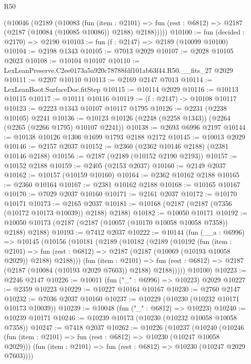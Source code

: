 \begin{lexlean}{R50}
\begin{coremodule}
      (@10046
        (@2189
          (@10083
            (fun (item : @2101) =>
            fun (rest : @6812) => @2187 (@2187 (@10084 (@10085 @10086)) @2188) @2188)))))
@10100 := fun (decided : @2170) => @2190
@10103 := fun (f : @2147) => @2189 (@10099 @10100)
@10104 := @2198 @1343
@10105 := @7013 @2029
@10107 := @2028 @10105 @2023
@10108 := @10104 @10107
@10110 := LexLeanPreserve.C2ee0173a5a920c78788fdf101ab63f44.R50.__fits_27 @2029
@10111 := @2207 @10110
@10113 := @2169 @2147 @7013
@10114 := LexLeanBoot.SurfaceDoc.fitStep
@10115 := @10114 @2029
@10116 := @10113 @10115
@10117 := @10111 @10116
@10119 := (f : @2147) -> @10108 @10117
@10123 := @2223 @1343 @10107 @10117 @1795
@10126 := @2231 (@2238 @10105) @2241
@10136 := @10123 @10126 (@2248 (@2258 @1343)) (@2264 (@2265 (@2266 @1795) @10107 @2241))
@10138 := @2693 @6996 @2197
@10144 := @10138 @10126 @1306 @1699 @1793 @2188 @2172
@10145 := @10013 @2029
@10146 := @2157 @2037
@10152 := @2360 (@2362 @10146 @2188) (@2381 @10146 @2188)
@10156 := @2187 (@2189 (@10152 @2190 @2193))
@10157 := @10152 @2188
@10159 := @2405 (@2153 @2037)
@10160 := @2149 @2037
@10162 := @10157 (@10159 @10160)
@10164 := @2362 @10162 @2188
@10165 := @2360 @10164
@10167 := @2381 @10162 @2188
@10168 := @10165 @10167
@10170 := @7029 @2037 @10160
@10171 := @2161 @2037
@10172 := @10170 @10171
@10173 := @2165 @2037
@10181 := @10168 (@2187 (@2187 (@7356 (@10172 @10173 @10039)) @2188) @2188)
@10182 := @10050 @10171
@10192 := @10050 @10173 (@2187 (@2187 (@10057 (@10170 @10058 @10058 @7358)) @2188) @2188)
@10193 := @7412 @2037
@10222 := @10144
    (fun (__a : @6996) =>
    @10145
      (@10156
        (@10181
          (@2189
            (@10182
              (@2189
                (@10192
                  (fun (item : @2101) =>
                  fun (rest : @6812) => @2187 (@2187 (@10069 (@10193 @10058 @2029)) @2188) @2188)))
              (fun (item : @2101) =>
              fun (rest : @6812) => @2187 (@2187 (@10084 (@10193 @2029 @7603)) @2188) @2188)))))
      @10100)
@10223 := @2246 @2147
@10226 := @10011 (fun ("_" : @6996) => @10223) @2029
@10227 := @2359 @10223
@10229 := @10227 @10164 @10167
@10230 := @2760 @2147
@10232 := @7036 @2037 @10160
@10237 := @10229 (@10230 (@10232 @10171 @10173 @10039))
@10239 := @10048 (fun ("_" : @6812) => @10223)
@10240 := @10239 @10171
@10246 := @10239 @10173 (@10230 (@10232 @10058 @10058 @7358))
@10247 := @7418 @2037
@10262 := @10226
    (@10237
      (@10240
        (@10246 (fun (item : @2101) => fun (rest : @6812) => @10230 (@10247 @10058 @2029)))
        (fun (item : @2101) => fun (rest : @6812) => @10230 (@10247 @2029 @7603))))

\end{coremodule}
\end{lexlean}
